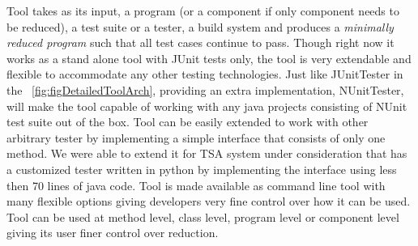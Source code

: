 Tool takes as its input, a program (or a component if only component needs to be reduced), a test suite or a tester, a build system and produces a \emph{minimally reduced program} such that all test cases continue to pass.  Though right now it works as a stand alone tool with JUnit tests only, the tool is very extendable and flexible to accommodate any other testing technologies. Just like JUnitTester in the ~\ref{fig:figDetailedToolArch}, providing an extra implementation, NUnitTester, will make the tool capable of working with any java projects consisting of NUnit test suite out of the box. Tool can be easily extended to work with other arbitrary tester by implementing a simple interface that consists of only one method. We were able to extend it for TSA system under consideration that has a customized tester written in python by implementing the interface using less then 70 lines of java code. Tool is made available as command line tool with many flexible options giving developers very fine control over how it can be used. Tool can be used at method level, class level, program level or component level giving its user finer control over reduction. 



